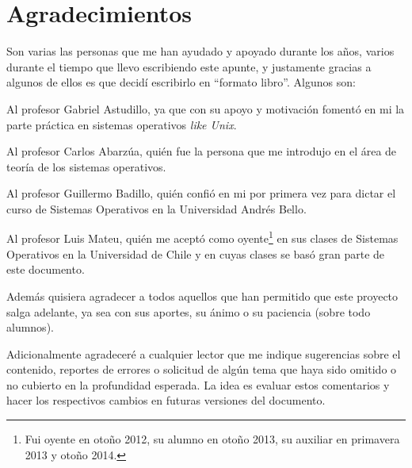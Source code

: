 %
%
%
%

\chapter*{Agradecimientos}
Son varias las personas que me han ayudado y apoyado durante los años, varios
durante el tiempo que llevo escribiendo este apunte, y justamente gracias a
algunos de ellos es que decidí escribirlo en ``formato libro''. Algunos son:

Al profesor Gabriel Astudillo, ya que con su apoyo y motivación fomentó en mi la
parte práctica en sistemas operativos \textit{like Unix}.

Al profesor Carlos Abarzúa, quién fue la persona que me introdujo en el área de
teoría de los sistemas operativos.

Al profesor Guillermo Badillo, quién confió en mi por primera vez para dictar el
curso de Sistemas Operativos en la Universidad Andrés Bello.

Al profesor Luis Mateu, quién me aceptó como oyente\footnote{Fui oyente en otoño
2012, su alumno en otoño 2013, su auxiliar en primavera 2013 y otoño 2014.} en
sus clases de Sistemas Operativos en la Universidad de Chile y en cuyas clases
se basó gran parte de este documento.

Además quisiera agradecer a todos aquellos que han permitido que este proyecto
salga adelante, ya sea con sus aportes, su ánimo o su paciencia (sobre todo
alumnos).

Adicionalmente agradeceré a cualquier lector que me indique sugerencias sobre el
contenido, reportes de errores o solicitud de algún tema que haya sido omitido o
no cubierto en la profundidad esperada. La idea es evaluar estos comentarios y
hacer los respectivos cambios en futuras versiones del documento.

\newpage
\mbox{}
\thispagestyle{empty}
